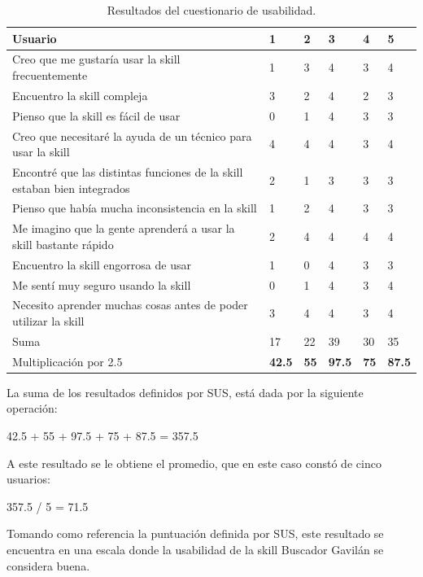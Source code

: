 \begin{table}[t]
  \begin{center}
    \begin{tabular}{ | p{9cm} | p{1cm} | p{1cm} | p{1cm} | p{1cm} | p{1cm} | }
      \hline
      Usuario & 1 & 2 & 3 & 4 & 5 \\ \hline
      Creo que me gustaría usar la skill frecuentemente & 1 & 3 & 4 & 3 & 4 \\ \hline
      Encuentro la skill compleja & 3 & 2 & 4 & 2 & 3 \\ \hline
      Pienso que la skill es fácil de usar & 0 & 1 & 4 & 3 & 3 \\ \hline
      Creo que necesitaré la ayuda de un técnico para usar la skill & 4 & 4 & 4 & 3 & 4 \\ \hline
      Encontré que las distintas funciones de la skill estaban bien integrados & 2 & 1 & 3 & 3 & 3 \\ \hline
      Pienso que había mucha inconsistencia en la skill & 1 & 2 & 4 & 3 & 3 \\ \hline
      Me imagino que la gente aprenderá a usar la skill bastante rápido & 2 & 4 & 4 & 4 & 4 \\ \hline
      Encuentro la skill engorrosa de usar & 1 & 0 & 4 & 3 & 3 \\ \hline
      Me sentí muy seguro usando la skill & 0 & 1 & 4 & 3 & 4 \\ \hline
      Necesito aprender muchas cosas antes de poder utilizar la skill & 3 & 4 & 4 & 3 & 4 \\ \hline
      Suma & 17 & 22 & 39 & 30 & 35 \\ \hline
      Multiplicación por 2.5 & \textbf{42.5} & \textbf{55} & \textbf{97.5} & \textbf{75} & \textbf{87.5} \\ \hline
    \end{tabular}
    \caption{Resultados del cuestionario de usabilidad.}
    \label{tab:t45}
  \end{center}
\end{table}

La suma de los resultados definidos por SUS, está dada por la siguiente operación:

42.5 + 55 + 97.5 + 75 + 87.5 = 357.5

A este resultado se le obtiene el promedio, que en este caso constó de cinco usuarios:

357.5 / 5 = 71.5

Tomando como referencia la puntuación definida por SUS, este resultado se encuentra en una escala donde la usabilidad de la skill Buscador Gavilán se considera buena.

